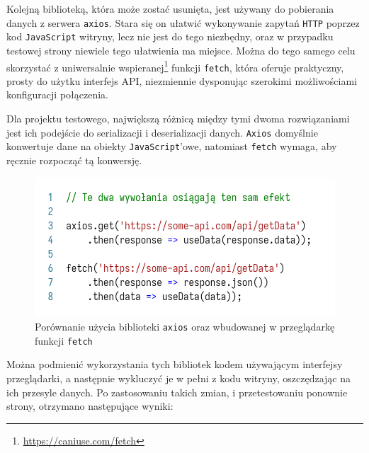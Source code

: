 \documentclass[licencjacka]{pracadypl}
\begin{document}
Kolejną biblioteką, która może zostać usunięta, jest używany do pobierania danych z serwera \texttt{axios}. Stara się on ułatwić wykonywanie zapytań \texttt{HTTP} poprzez kod \texttt{JavaScript} witryny, lecz nie jest do tego niezbędny, oraz w przypadku testowej strony niewiele tego ułatwienia ma miejsce. Można do tego samego celu skorzystać z uniwersalnie wspieranej\footnote{\url{https://caniuse.com/fetch}} funkcji \texttt{fetch}, która oferuje praktyczny, prosty do użytku interfejs API, niezmiennie dysponując szerokimi możliwościami konfiguracji połączenia.

Dla projektu testowego, największą różnicą między tymi dwoma rozwiązaniami jest ich podejście do serializacji i deserializacji danych. \texttt{Axios} domyślnie konwertuje dane na obiekty \texttt{JavaScript}'owe, natomiast \texttt{fetch} wymaga, aby ręcznie rozpocząć tą konwersję.

\begin{figure}[H]
  \centering
  \includegraphics[width=\linewidth/\real{1.2}]{images/code-js-axios-v-fetch.png}
  \caption{Porównanie użycia biblioteki \texttt{axios} oraz wbudowanej w przeglądarkę funkcji \texttt{fetch}}
  \label{fig:code-js-axios-v-fetch}
\end{figure}

Można podmienić wykorzystania tych bibliotek kodem używającym interfejsy przeglądarki, a następnie wykluczyć je w pełni z kodu witryny, oszczędzając na ich przesyle danych. Po zastosowaniu takich zmian, i przetestowaniu ponownie strony, otrzymano następujące wyniki:
\end{document}

